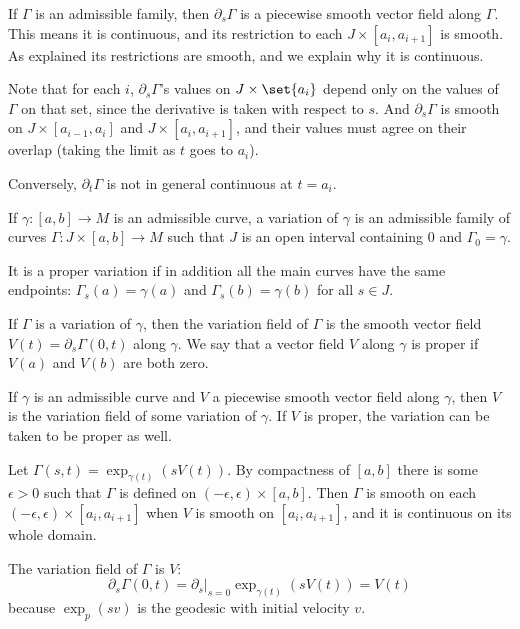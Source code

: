 If $\Gamma$ is an admissible family, then $\partial_s\Gamma$ is a piecewise smooth vector field along $\Gamma$.
This means it is continuous, and its restriction to each $J\times[a_i,a_{i+1}]$ is smooth.
As explained its restrictions are smooth, and we explain why it is continuous.

Note that for each $i$, $\partial_s\Gamma$'s values on $J\times\set{a_i}$ depend only on the values of $\Gamma$
on that set, since the derivative is taken with respect to $s$.
And $\partial_s\Gamma$ is smooth on $J\times[a_{i-1},a_i]$ and $J\times[a_i,a_{i+1}]$, and their values must agree on their
overlap (taking the limit as $t$ goes to $a_i$).

Conversely, $\partial_t\Gamma$ is not in general continuous at $t=a_i$.

\bdefn

    If $\gamma\colon[a,b]\to M$ is an admissible curve, a {\emphcolor variation} of $\gamma$ is an admissible family
    of curves $\Gamma\colon J\times[a,b]\to M$ such that $J$ is an open interval containing $0$ and $\Gamma_0=\gamma$.

    It is a {\emphcolor proper variation} if in addition all the main curves have the same endpoints:
    $\Gamma_s(a)=\gamma(a)$ and $\Gamma_s(b)=\gamma(b)$ for all $s\in J$.

    If $\Gamma$ is a variation of $\gamma$, then the {\emphcolor variation field} of $\Gamma$ is the smooth vector
    field $V(t)=\partial_s\Gamma(0,t)$ along $\gamma$.
    We say that a vector field $V$ along $\gamma$ is {\emphcolor proper} if $V(a)$ and $V(b)$ are both zero.

\edefn

\blemm

    If $\gamma$ is an admissible curve and $V$ a piecewise smooth vector field along $\gamma$, then $V$ is the
    variation field of some variation of $\gamma$.
    If $V$ is proper, the variation can be taken to be proper as well.

\elemm

\bproof

    Let $\Gamma(s,t)=\exp_{\gamma(t)}(sV(t))$.
    By compactness of $[a,b]$ there is some $\epsilon>0$ such that $\Gamma$ is defined on
    $(-\epsilon,\epsilon)\times[a,b]$.
    Then $\Gamma$ is smooth on each $(-\epsilon,\epsilon)\times[a_i,a_{i+1}]$ when $V$ is smooth on $[a_i,a_{i+1}]$,
    and it is continuous on its whole domain.

    The variation field of $\Gamma$ is $V$:
    $$ \partial_s\Gamma(0,t) = \partial_s|_{s=0}\exp_{\gamma(t)}(sV(t)) = V(t) $$
    because $\exp_p(sv)$ is the geodesic with initial velocity $v$.

